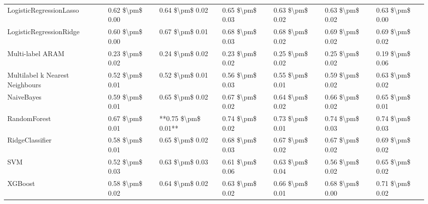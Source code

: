 \begin{tabular}{lllllll}
LogisticRegressionLasso         &  0.62 \$\textbackslash pm\$ 0.00 &           0.64 \$\textbackslash pm\$ 0.02 &       0.65 \$\textbackslash pm\$ 0.03 &        0.63 \$\textbackslash pm\$ 0.02 &                         0.63 \$\textbackslash pm\$ 0.02 &  0.63 \$\textbackslash pm\$ 0.00 \\
LogisticRegressionRidge         &  0.60 \$\textbackslash pm\$ 0.00 &           0.67 \$\textbackslash pm\$ 0.01 &       0.68 \$\textbackslash pm\$ 0.03 &        0.68 \$\textbackslash pm\$ 0.02 &                         0.69 \$\textbackslash pm\$ 0.02 &  0.69 \$\textbackslash pm\$ 0.02 \\
Multi-label ARAM                &  0.23 \$\textbackslash pm\$ 0.02 &           0.24 \$\textbackslash pm\$ 0.02 &       0.23 \$\textbackslash pm\$ 0.02 &        0.25 \$\textbackslash pm\$ 0.02 &                         0.25 \$\textbackslash pm\$ 0.02 &  0.19 \$\textbackslash pm\$ 0.06 \\
Multilabel k Nearest Neighbours &  0.52 \$\textbackslash pm\$ 0.01 &           0.52 \$\textbackslash pm\$ 0.01 &       0.56 \$\textbackslash pm\$ 0.03 &        0.55 \$\textbackslash pm\$ 0.01 &                         0.59 \$\textbackslash pm\$ 0.02 &  0.63 \$\textbackslash pm\$ 0.02 \\
NaiveBayes                      &  0.59 \$\textbackslash pm\$ 0.01 &           0.65 \$\textbackslash pm\$ 0.02 &       0.67 \$\textbackslash pm\$ 0.02 &        0.64 \$\textbackslash pm\$ 0.02 &                         0.66 \$\textbackslash pm\$ 0.02 &  0.65 \$\textbackslash pm\$ 0.01 \\
RandomForest                    &  0.67 \$\textbackslash pm\$ 0.01 &       **0.75 \$\textbackslash pm\$ 0.01** &       0.74 \$\textbackslash pm\$ 0.02 &        0.73 \$\textbackslash pm\$ 0.01 &                         0.74 \$\textbackslash pm\$ 0.03 &  0.74 \$\textbackslash pm\$ 0.03 \\
RidgeClassifier                 &  0.58 \$\textbackslash pm\$ 0.01 &           0.65 \$\textbackslash pm\$ 0.02 &       0.68 \$\textbackslash pm\$ 0.03 &        0.67 \$\textbackslash pm\$ 0.02 &                         0.67 \$\textbackslash pm\$ 0.02 &  0.69 \$\textbackslash pm\$ 0.02 \\
SVM                             &  0.52 \$\textbackslash pm\$ 0.03 &           0.63 \$\textbackslash pm\$ 0.03 &       0.61 \$\textbackslash pm\$ 0.06 &        0.63 \$\textbackslash pm\$ 0.04 &                         0.56 \$\textbackslash pm\$ 0.02 &  0.65 \$\textbackslash pm\$ 0.02 \\
XGBoost                         &  0.58 \$\textbackslash pm\$ 0.02 &           0.64 \$\textbackslash pm\$ 0.02 &       0.63 \$\textbackslash pm\$ 0.02 &        0.66 \$\textbackslash pm\$ 0.01 &                         0.68 \$\textbackslash pm\$ 0.00 &  0.71 \$\textbackslash pm\$ 0.02 \\
\bottomrule
\end{tabular}
